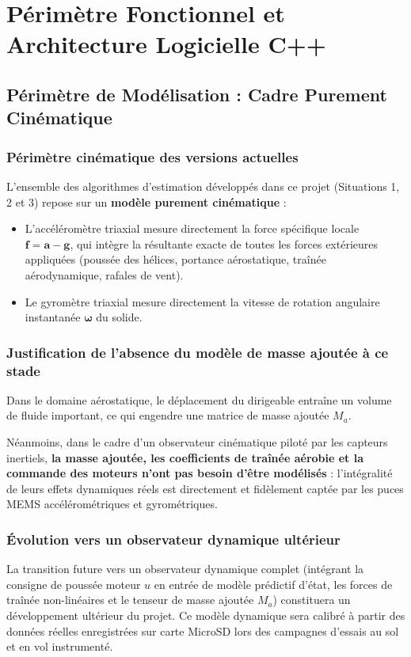 \documentclass[../Implementation.tex]{subfiles}
\begin{document}
\section{Périmètre Fonctionnel et Architecture Logicielle C++}

\subsection{Périmètre de Modélisation : Cadre Purement Cinématique}

\subsubsection{Périmètre cinématique des versions actuelles}
L'ensemble des algorithmes d'estimation développés dans ce projet (Situations 1, 2 et 3) repose sur un \textbf{modèle purement cinématique} :
\begin{itemize}
    \item L'accéléromètre triaxial mesure directement la force spécifique locale $\mathbf{f} = \mathbf{a} - \mathbf{g}$, qui intègre la résultante exacte de toutes les forces extérieures appliquées (poussée des hélices, portance aérostatique, traînée aérodynamique, rafales de vent).
    \item Le gyromètre triaxial mesure directement la vitesse de rotation angulaire instantanée $\boldsymbol{\omega}$ du solide.
\end{itemize}

\subsubsection{Justification de l'absence du modèle de masse ajoutée à ce stade}
Dans le domaine aérostatique, le déplacement du dirigeable entraîne un volume de fluide important, ce qui engendre une matrice de masse ajoutée $M_a$. 

Néanmoins, dans le cadre d'un observateur cinématique piloté par les capteurs inertiels, \textbf{la masse ajoutée, les coefficients de traînée aérobie et la commande des moteurs n'ont pas besoin d'être modélisés} : l'intégralité de leurs effets dynamiques réels est directement et fidèlement captée par les puces MEMS accélérométriques et gyrométriques.

\subsubsection{Évolution vers un observateur dynamique ultérieur}
La transition future vers un observateur dynamique complet (intégrant la consigne de poussée moteur $u$ en entrée de modèle prédictif d'état, les forces de traînée non-linéaires et le tenseur de masse ajoutée $M_a$) constituera un développement ultérieur du projet. Ce modèle dynamique sera calibré à partir des données réelles enregistrées sur carte MicroSD lors des campagnes d'essais au sol et en vol instrumenté.
\end{document}
